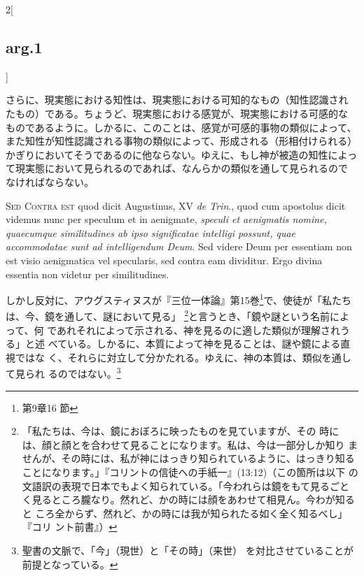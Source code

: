 \documentclass[paper=a4paper,fontsize=10pt,jafontsize=9pt,titlepage]{jlreq}
\begin{document}
\begin{paracol}{2}[\subsection{arg.1}]
\switchcolumn

さらに、現実態における知性は、現実態における可知的なもの（知性認識され
たもの）である。ちょうど、現実態における感覚が、現実態における可感的な
ものであるように。しかるに、このことは、感覚が可感的事物の類似によって、
また知性が知性認識される事物の類似によって、形成される（形相付けられる）
かぎりにおいてそうであるのに他ならない。ゆえに、もし神が被造の知性によっ
て現実態において見られるのであれば、なんらかの類似を通して見られるので
なければならない。

\switchcolumn*[\subsection{s.c.}]

{\scshape Sed Contra est} quod dicit Augustinus, XV {\itshape de Trin}., quod
cum apostolus dicit \guillemotleft videmus nunc per speculum et in
aenigmate\guillemotright, {\itshape speculi et aenigmatis nomine,
quaecumque similitudines ab ipso significatae intelligi possunt, quae
accommodatae sunt ad intelligendum Deum}. Sed videre Deum per
essentiam non est visio aenigmatica vel specularis, sed contra eam
dividitur. Ergo divina essentia non videtur per similitudines.

\switchcolumn

しかし反対に、アウグスティヌスが『三位一体論』第15巻\footnote{第9章16
節}で、使徒が「私たちは、今、鏡を通して、謎において見る」
\footnote{「私たちは、今は、鏡におぼろに映ったものを見ていますが、その
時には、顔と顔とを合わせて見ることになります。私は、今は一部分しか知り
ませんが、その時には、私が神にはっきり知られているように、はっきり知る
ことになります。」『コリントの信徒への手紙一』(13:12)（この箇所は以下
の文語訳の表現で日本でもよく知られている。「今われらは鏡をもて見るごと
く見るところ朧なり。然れど、かの時には顔をあわせて相見ん。今わが知ると
ころ全からず、然れど、かの時には我が知られたる如く全く知るべし」『コリ
ント前書』）}と言うとき、「鏡や謎という名前によって、何
であれそれによって示される、神を見るのに適した類似が理解されうる」と述
べている。しかるに、本質によって神を見ることは、謎や鏡による直視ではな
く、それらに対立して分かたれる。ゆえに、神の本質は、類似を通して見られ
るのではない。\footnote{聖書の文脈で、「今」（現世）と「その時」（来世）
を対比させていることが前提となっている。}



\end{paracol}
\end{document}
